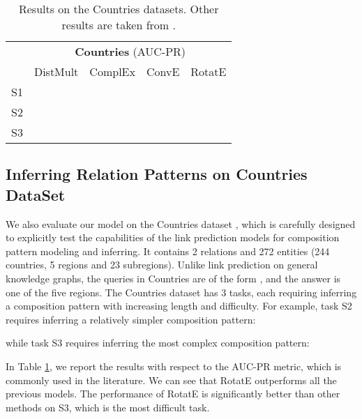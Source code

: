 \documentclass{article} \usepackage{iclr2019_conference,times}
\def\method{RotatE}
\begin{document}
\begin{table}[t]
\centering
\small
\begin{tabular}{|c|c|c|c|c|}
\hline
& \multicolumn{4}{c|}{\textbf{Countries} (AUC-PR)}\\
\cline{2-5}
& DistMult & ComplEx & ConvE & \method{} \\
\hline
S1 &  &  & & \\
S2 &  &  & & \\
S3 &  &  & & \\
\hline
\end{tabular}
\caption{Results on the Countries datasets. Other results are taken from  \citep{dettmers2017convolutional}.}
\label{tab:auc}
\end{table}

\subsection{Inferring Relation Patterns on Countries DataSet}
We also evaluate our model on the Countries dataset \citep{bouchard2015approximate,nickel2016holographic}, which is carefully designed to explicitly test the capabilities of the link prediction models for composition pattern modeling and inferring. It contains 2 relations and 272 entities (244 countries, 5 regions and 23 subregions). Unlike link prediction on general knowledge graphs, the queries in Countries are of the form , and the answer is one of the five regions. The Countries dataset has 3 tasks, each requiring inferring a composition pattern with increasing length and difficulty.
For example, task S2 requires inferring a relatively simpler composition pattern:


while task S3 requires inferring the most complex composition pattern:


In Table \ref{tab:auc}, we report the results with respect to the AUC-PR metric, which is commonly used in the literature. We can see that \method{} outperforms all the previous models. The performance of \method{}  is significantly better than other methods on S3, which is the most difficult task.
\end{document}
